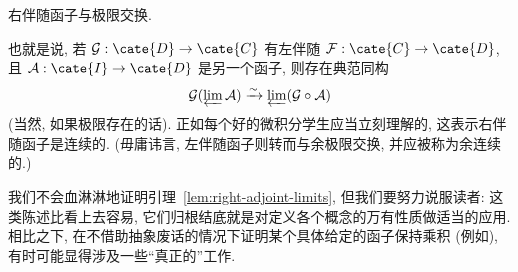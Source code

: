 \begin{lemma}\label{lem:right-adjoint-limits}
右伴随函子与极限交换.
\end{lemma}

也就是说, 若 $\mathcal{G}:\cate{D}\to\cate{C}$ 有左伴随 $\mathcal{F}:\cate{C}\to\cate{D}$, 且 $\mathcal{A}:\cate{I}\to\cate{D}$ 是另一个函子, 则存在典范同构
\[
\mathcal{G}(\varprojlim\mathcal{A})\xrightarrow{\sim}\varprojlim(\mathcal{G}\circ\mathcal{A})
\]
(当然, 如果极限存在的话). 正如每个好的微积分学生应当立刻理解的, 这表示右伴随函子是连续的. (毋庸讳言, 左伴随函子则转而与余极限交换, 并应被称为余连续的.)

我们不会血淋淋地证明引理~\ref{lem:right-adjoint-limits}, 但我们要努力说服读者: 这类陈述比看上去容易, 它们归根结底就是对定义各个概念的万有性质做适当的应用. 相比之下, 在不借助抽象废话的情况下证明某个具体给定的函子保持乘积 (例如), 有时可能显得涉及一些``真正的''工作.


